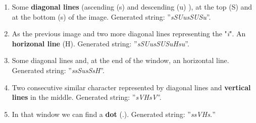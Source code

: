 \begin{enumerate}[label=(\alph*)]
\item Some \textbf{diagonal lines} (ascending (s) and descending (u) ), at the top (S) and at the bottom (s) of the image. Generated string: ''\emph{sSUusSUSu}''.
\begin{figure}[H]
\centering
{}
\end{figure} 
\item As the previous image and two more diagonal lines representing the "\emph{i}". An \textbf{horizonal line} (H). Generated string: ''\emph{sSUusSUSuHsu}''.
\begin{figure}[H]
\centering
{}
\end{figure} 
\item Some diagonal lines and, at the end of the window, an horizontal line. Generated string: ''\emph{ssSusSsH}''.
\begin{figure}[H]
\centering
{}
\end{figure} 
\item Two consecutive similar character represented by diagonal lines and \textbf{vertical lines} in the middle. Generated string: ''\emph{sVHsV}''.
\begin{figure}[H]
\centering
{}
\end{figure} 
\item In that window we can find a \textbf{dot} (.). Generated string: ''\emph{ssVHs.}''
\begin{figure}[H]
\centering
{}

\end{figure}
\end{enumerate}
